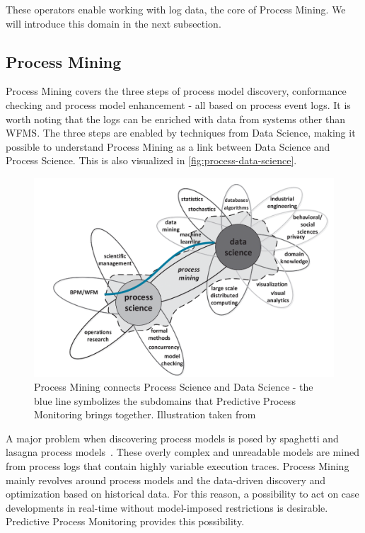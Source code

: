 These operators enable working with log data, the core of Process Mining.
We will introduce this domain in the next subsection.

\subsection{Process Mining}\label{sec:process-mining}
Process Mining covers the three steps of process model discovery, conformance checking and process model enhancement \cite{Aalst2016} -  all based on process event logs. It is worth noting that the logs can be enriched with data from systems other than WFMS. The three steps are enabled by techniques from Data Science, making it possible to understand Process Mining as a link between Data Science and Process Science. This is also visualized in \autoref{fig:process-data-science}.

\begin{figure}[!htb]
    \centering
    \includegraphics[width=.8\textwidth]{gfx/process-data-science.png}
    \caption[Process Mining connects two disciplines]{Process Mining connects Process Science and Data Science - the blue line symbolizes the subdomains that Predictive Process Monitoring brings together. Illustration taken from~\cite[p.18]{Aalst2016}}
    \label{fig:process-data-science}
\end{figure}

A major problem when discovering process models is posed by spaghetti and lasagna process models~\cite{Aalst2016}. These overly complex and unreadable models are mined from process logs that contain highly variable execution traces. Process Mining mainly revolves around process models and the data-driven discovery and optimization based on historical data. For this reason, a possibility to act on case developments in real-time without model-imposed restrictions is desirable. Predictive Process Monitoring provides this possibility.

